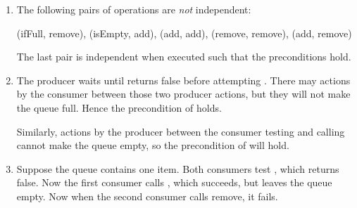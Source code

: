 \begin{answer}
\begin{enumerate}
\item
The following pairs of operations are \emph{not} independent: 
\begin{scala}
(ifFull, remove), (isEmpty, add), 
(add, add), (remove, remove), (add, remove)
\end{scala}
The last pair is independent when executed such that the preconditions hold. 

\item
The producer waits until  returns false before attempting
.  There may actions by the consumer between those two producer
actions, but they will not make the queue full.  Hence the precondition of
 holds.

Similarly, actions by the producer between the consumer testing
 and calling  cannot make the queue empty, so the
precondition of  will hold.

\item
Suppose the queue contains one item.  Both consumers test ,
which returns false.  Now the first consumer calls , which
succeeds, but leaves the queue empty.  Now when the second consumer calls
remove, it fails.
\end{enumerate}
\end{answer}

